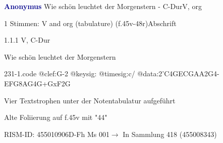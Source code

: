 \documentclass[twocolumn, 12pt]{book}
\begin{document}
\par \vspace{16pt} \textcolor{darkblue}{\textbf{Anonymus  }}\hfillplus{\textbf{[231]}}\newline Wie schön leuchtet der Morgenstern - C-Dur\newline V, org
\par \begin{itshape}\end{itshape} 
\par \textcolor{darkblue}{}  1 Stimmen: V and org (tabulature)  (f.45v-48r)\newline Abschrift
\par 1.1.1  V, C-Dur\newline \begin{footnotesize} Wie schön leuchtet der Morgenstern \end{footnotesize}  
\begin{filecontents*}{231-1.code}
@clef:G-2
@keysig:
@timesig:c/
@data:2'C4GECGAA2G4-EFG{8AG}4G+GxF2G
\end{filecontents*}
\newline %
\par Vier Textstrophen unter der Notentabulatur aufgeführt
\par Alte Foliierung auf f.45v mit "44"
\par RISM-ID: 455010906\newline D-Fh  Ms 001\newline $\rightarrow$ In Sammlung 418 (455008343)
      
\end{document}

